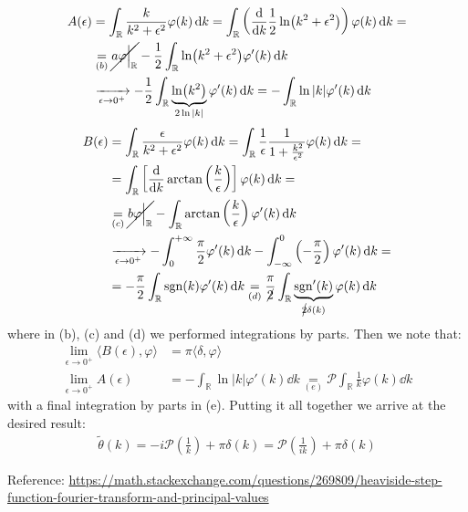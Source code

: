 \documentclass[../template.tex]{subfiles}
\begin{document}
\begin{expl}
\begin{align*}
        A(\epsilon) &= \int_{\mathbb{R}} \frac{k}{k^2 + \epsilon^2} \varphi(k) \dd{k} = \int_{\mathbb{R}} \left(\dv{k} \frac{1}{2} \ln(k^2 + \epsilon^2) \right) \varphi(k) \dd{k} =\\
        &\underset{(b)}{=} \cancel{a \varphi \Big|_{\mathbb{R}}} - \frac{1}{2} \int_{\mathbb{R}} \ln(k^2 + \epsilon^2) \varphi'(k) \dd{k}  \\
        &\xrightarrow[\epsilon \to 0^+]{}    -\frac{1}{2}\int_{\mathbb{R}} \underbrace{\ln(k^2) }_{2 \ln|k|}\varphi'(k) \dd{k} = - \int_{\mathbb{R}} \ln|k| \varphi'(k) \dd{k}
    \end{align*}
    \begin{align*}
        B(\epsilon) &= \int_{\mathbb{R}} \frac{\epsilon}{k^2 + \epsilon^2} \varphi(k) \dd{k} = \int_{\mathbb{R}} \frac{1}{\epsilon} \frac{1}{1 + \frac{k^2}{\epsilon^2} }  \varphi(k) \dd{k} = \\
        &= \int_{\mathbb{R}} \left[\dv{k} \arctan\left(\frac{k}{\epsilon} \right) \right] \varphi(k) \dd{k} =\\
        &\underset{(c)}{=}  \cancel{b\varphi \Big|_{\mathbb{R}}} - \int_{\mathbb{R}} \arctan\left(\frac{k}{\epsilon} \right) \varphi'(k) \dd{k} \\
        &\xrightarrow[\epsilon \to 0^+]{} - \int_0^{+\infty} \frac{\pi}{2} \varphi'(k) \dd{k} - \int_{-\infty}^0 \left(-\frac{\pi}{2} \right)  \varphi'(k) \dd{k} =\\
        &= - \frac{\pi}{2} \int_{\mathbb{R}} \operatorname{sgn}(k) \varphi'(k) \dd{k} \underset{(d)}{=} \frac{\pi}{\cancel{2}} \int_{\mathbb{R}} \underbrace{\operatorname{sgn}'(k)}_{\cancel{2} \delta(k)}\varphi(k) \dd{k}
    \end{align*}
    where in (b), (c) and (d) we performed integrations by parts. Then we note that:
    \begin{align*}
        \lim_{\epsilon \to 0^+} \langle B(\epsilon), \varphi \rangle &= \pi \langle \delta, \varphi \rangle\\
        \lim_{\epsilon \to 0^+} A(\epsilon) &= -\int_{\mathbb{R}} \ln|k| \varphi'(k) \dd{k} \underset{(e)}{=} \mathcal{P}\int_{\mathbb{R}}\frac{1}{k} \varphi(k) \dd{k} 
    \end{align*}
    with a final integration by parts in (e). Putting it all together we arrive at the desired result:
    \begin{align*}
        \tilde{\theta}(k) = -i \mathcal{P}(\frac{1}{k} ) + \pi \delta(k) = \mathcal{P}\left(\frac{1}{ik} \right) + \pi \delta(k)
    \end{align*}

    Reference: \url{https://math.stackexchange.com/questions/269809/heaviside-step-function-fourier-transform-and-principal-values}
\end{expl}
\end{document}
